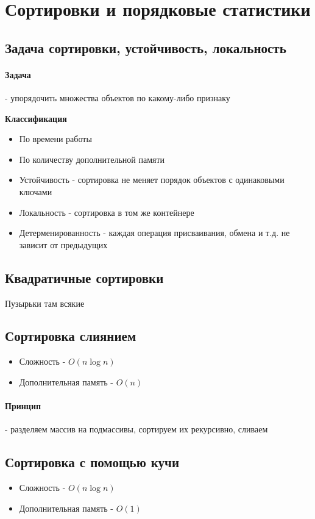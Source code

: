 \documentclass[a4paper,10pt]{article}
\begin{document}
	\section{Сортировки и порядковые статистики}
	\subsection{Задача сортировки, устойчивость, локальность}
	\paragraph{Задача} - упорядочить множества объектов по какому-либо признаку \\
	\begin{center} 
		\textbf{Классификация} 
	\end{center}
	\begin{itemize}
		\item По времени работы
		\item По количеству дополнительной памяти
		\item Устойчивость - сортировка не меняет порядок объектов с одинаковыми ключами
		\item Локальность - сортировка в том же контейнере
		\item Детерменированность - каждая операция присваивания, обмена и т.д. не зависит от предыдущих
	\end{itemize}
	\subsection{Квадратичные сортировки}
	Пузырьки там всякие \\
	\subsection{Сортировка слиянием}
	\begin{itemize}
		\item Сложность - $O(n\log n)$
		\item Дополнительная память - $O(n)$
	\end{itemize}
	\paragraph{Принцип} - разделяем массив на подмассивы, сортируем их рекурсивно, сливаем
	\subsection{Сортировка с помощью кучи}
	\begin{itemize}
		\item Сложность - $O(n\log n)$
		\item Дополнительная память - $O(1)$
	\end{itemize}
\end{document}
